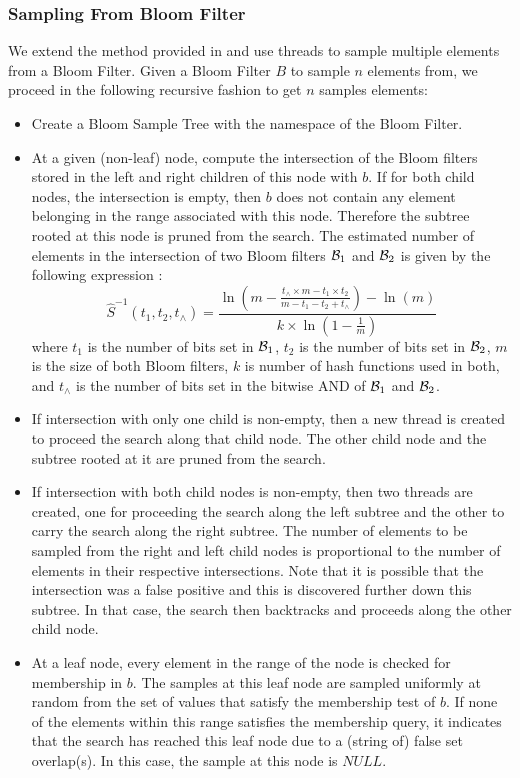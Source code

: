 \documentclass[a4paper]{article}
\def\CB{{\cal B}}
\begin{document}
\subsubsection{Sampling From Bloom Filter}
We extend the method provided in \cite{sengupta:2017} and use threads to sample multiple elements from a Bloom Filter. \newline
Given a Bloom Filter $B$ to sample $n$ elements from, we proceed in the following recursive fashion to get $n$ samples elements:
\newline
\begin{itemize}
    \item Create a Bloom Sample Tree with the namespace of the Bloom Filter.
    \item At a given (non-leaf) node, compute the intersection of the Bloom filters stored in the left and right children of this node with $b$. If for both child nodes, the intersection is empty, then $b$ does not contain any element belonging in the range associated with this node. Therefore the subtree rooted at this node is pruned from the search. 
    \newline
    The estimated number of elements in the intersection of two Bloom filters $\CB_1$ and $\CB_2$ is given by the following expression \cite{Papapetrou2010}:
$$
\hat{S}^{-1} ( t_1, t_2, t_{\wedge} ) = 
\frac{
    \ln{\left(  m - \frac{t_{\wedge} \times m - t_1 \times t_2}{m - t_1 - t_2 + t_\wedge} \right) - \ln(m)}
}
{
    k \times \ln \left(1 - \frac{1}{m} \right)
}
$$
where $t_1$ is the number of bits set in $\CB_1$, $t_2$ is the number of bits set in $\CB_2$, $m$ is the size of both Bloom filters, $k$ is number of hash functions used in both, and $t_\wedge$ is the number of bits set in the bitwise AND of $\CB_1$ and $\CB_2$. 

\item If intersection with only one child is non-empty, then a new thread is created to proceed the search along that child node. The other child node and the subtree rooted at it are pruned from the search.

\item If intersection with both child nodes is non-empty, then two threads are created, one for proceeding the search along the left subtree and the other to carry the search along the right subtree. The number of elements to be sampled from the right and left child nodes is proportional to the number of elements in their respective intersections. Note that it is possible that the intersection was a false positive and this is discovered further down this subtree. In that case, the search then backtracks and proceeds along the other child node.


\item At a leaf node, every element in the range of the node is checked for membership in $b$. The samples at this leaf node are sampled uniformly at random from the set of values that satisfy the membership test of $b$. If none of the elements within this range satisfies the membership query, it indicates that the search has reached this leaf node due to a (string of) false set overlap(s). In this case, the sample at this node is $NULL$.

\end{itemize}
\end{document}
